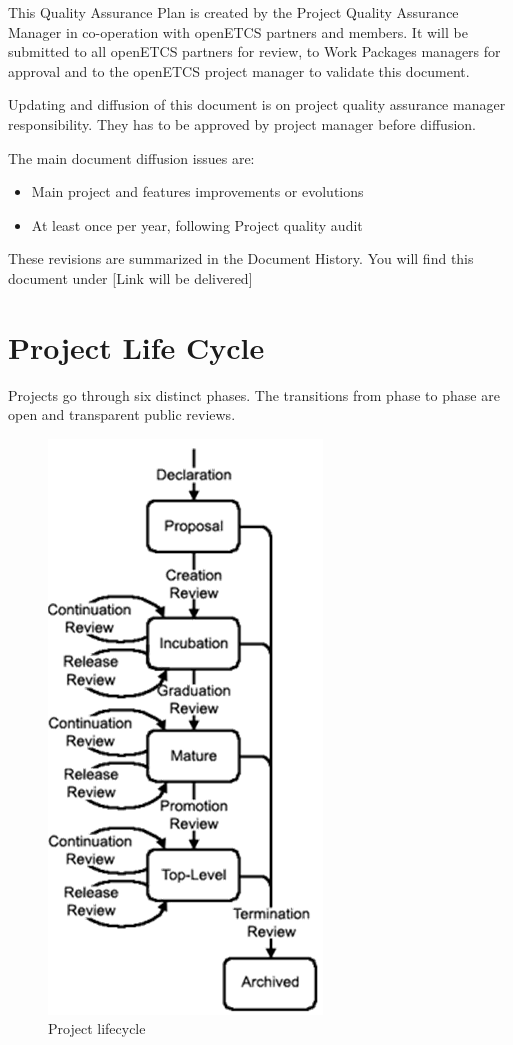 \documentclass{template/openetcs_article}
\begin{document}
This Quality Assurance Plan is created by the Project Quality Assurance Manager in co-operation with openETCS partners and members. It will be submitted to all openETCS partners for review, to Work Packages managers for approval and to the openETCS project manager to validate this document.

Updating and diffusion of this document is on project quality assurance manager responsibility. They has to be approved by project manager before diffusion.

The main document diffusion issues are:
\begin{itemize}
\item Main project and features improvements or evolutions
\item At least once per year, following Project quality audit
\end{itemize}
These revisions are summarized in the Document History. You will find this document under  [Link will be delivered]


\section{Project Life Cycle}
Projects go through six distinct phases. The transitions from phase to phase are open and transparent public reviews.

\begin{figure}
\centering
\includegraphics[width=.4\textwidth]{./figures/lifecycle.PNG}
\caption{Project lifecycle}
\end{figure}
  
\end{document}
